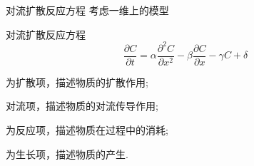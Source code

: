 \documentclass[xcolor=dvipsnames]{beamer}
\begin{document}
	\begin{frame}{对流扩散反应方程}
	考虑一维上的模型
	\begin{block}{\fangsong 对流扩散反应方程}
	\begin{equation}
	\dfrac{\partial C}{\partial t}= \alpha\dfrac{\partial^2 C}{\partial x^2}-\beta\dfrac{\partial C}{\partial x}-\gamma C + \delta
	\end{equation}
	\end{block}
	\begin{description}\setlength{\itemsep}{0.4em}
	\item[$\dfrac{\partial^2 C}{\partial x^2}$]为扩散项，描述物质的扩散作用;
	\item[$\dfrac{\partial C}{\partial x}$]对流项，描述物质的对流传导作用;
	\item[$C$]为反应项，描述物质在过程中的消耗;
	\item[$\delta$]为生长项，描述物质的产生.
	\end{description}
	\end{frame}
\end{document}
